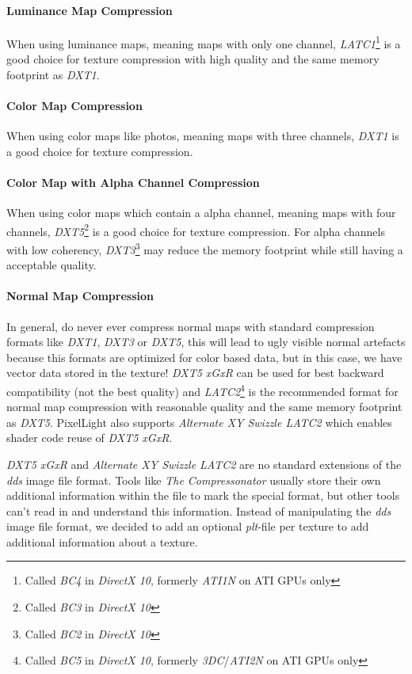 \paragraph{Luminance Map Compression}
When using luminance maps, meaning maps with only one channel, \emph{LATC1}\footnote{Called \emph{BC4} in \emph{DirectX 10}, formerly \emph{ATI1N} on ATI \ac{GPU}s only} is a good choice for texture compression with high quality and the same memory footprint as \emph{DXT1}.


\paragraph{Color Map Compression}
When using color maps like photos, meaning maps with three channels, \emph{DXT1} is a good choice for texture compression.


\paragraph{Color Map with Alpha Channel Compression}
When using color maps which contain a alpha channel, meaning maps with four channels, \emph{DXT5}\footnote{Called \emph{BC3} in \emph{DirectX 10}} is a good choice for texture compression. For alpha channels with low coherency, \emph{DXT3}\footnote{Called \emph{BC2} in \emph{DirectX 10}} may reduce the memory footprint while still having a acceptable quality.


\paragraph{Normal Map Compression}
In general, do never ever compress normal maps with standard compression formats like \emph{DXT1}, \emph{DXT3} or \emph{DXT5}, this will lead to ugly visible normal artefacts because this formats are optimized for color based data, but in this case, we have vector data stored in the texture! \emph{DXT5 xGxR} can be used for best backward compatibility (not the best quality) and \emph{LATC2}\footnote{Called \emph{BC5} in \emph{DirectX 10}, formerly \emph{3DC}/\emph{ATI2N} on ATI \ac{GPU}s only} is the recommended format for normal map compression with reasonable quality and the same memory footprint as \emph{DXT5}. PixelLight also supports \emph{Alternate XY Swizzle LATC2} which enables shader code reuse of \emph{DXT5 xGxR}.

\emph{DXT5 xGxR} and \emph{Alternate XY Swizzle LATC2} are no standard extensions of the \emph{dds} image file format. Tools like \emph{The Compressonator} usually store their own additional information within the file to mark the special format, but other tools can't read in and understand this information. Instead of manipulating the \emph{dds} image file format, we decided to add an optional \emph{plt}-file per texture to add additional information about a texture.

